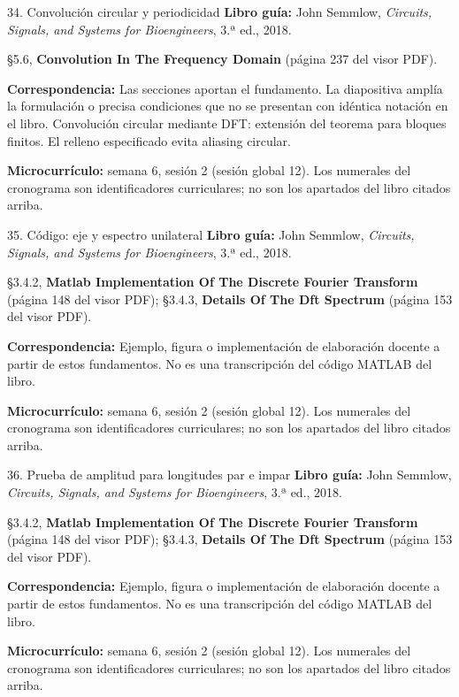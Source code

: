 \documentclass[
  10pt,
  ignorenonframetext,
  aspectratio=169,
  spanish,
]{beamer}
\begin{document}
\begin{frame}{34. Convolución circular y periodicidad}
\label{convoluciuxf3n-circular-y-periodicidad}
\textbf{Libro guía:} John Semmlow, \emph{Circuits, Signals, and Systems
for Bioengineers}, 3.ª ed., 2018.

§5.6, \textbf{Convolution In The Frequency Domain} (página 237 del visor
PDF).

\textbf{Correspondencia:} Las secciones aportan el fundamento. La
diapositiva amplía la formulación o precisa condiciones que no se
presentan con idéntica notación en el libro. Convolución circular
mediante DFT: extensión del teorema para bloques finitos. El relleno
especificado evita aliasing circular.

\textbf{Microcurrículo:} semana 6, sesión 2 (sesión global 12). Los
numerales del cronograma son identificadores curriculares; no son los
apartados del libro citados arriba.
\end{frame}

\begin{frame}{35. Código: eje y espectro unilateral}
\label{cuxf3digo-eje-y-espectro-unilateral}
\textbf{Libro guía:} John Semmlow, \emph{Circuits, Signals, and Systems
for Bioengineers}, 3.ª ed., 2018.

§3.4.2, \textbf{Matlab Implementation Of The Discrete Fourier Transform}
(página 148 del visor PDF); §3.4.3, \textbf{Details Of The Dft Spectrum}
(página 153 del visor PDF).

\textbf{Correspondencia:} Ejemplo, figura o implementación de
elaboración docente a partir de estos fundamentos. No es una
transcripción del código MATLAB del libro.

\textbf{Microcurrículo:} semana 6, sesión 2 (sesión global 12). Los
numerales del cronograma son identificadores curriculares; no son los
apartados del libro citados arriba.
\end{frame}

\begin{frame}{36. Prueba de amplitud para longitudes par e impar}
\label{prueba-de-amplitud-para-longitudes-par-e-impar}
\textbf{Libro guía:} John Semmlow, \emph{Circuits, Signals, and Systems
for Bioengineers}, 3.ª ed., 2018.

§3.4.2, \textbf{Matlab Implementation Of The Discrete Fourier Transform}
(página 148 del visor PDF); §3.4.3, \textbf{Details Of The Dft Spectrum}
(página 153 del visor PDF).

\textbf{Correspondencia:} Ejemplo, figura o implementación de
elaboración docente a partir de estos fundamentos. No es una
transcripción del código MATLAB del libro.

\textbf{Microcurrículo:} semana 6, sesión 2 (sesión global 12). Los
numerales del cronograma son identificadores curriculares; no son los
apartados del libro citados arriba.
\end{frame}
\end{document}
